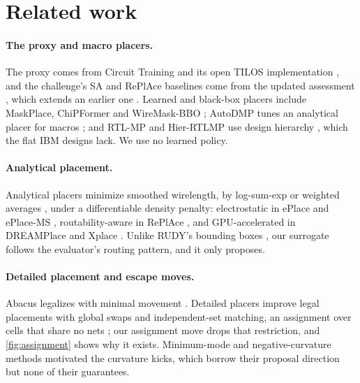 \section{Related work}\label{sec:related}

\paragraph{The proxy and macro placers.} The proxy comes from Circuit Training
\citep{mirhoseini2021graph} and its open TILOS implementation \citep{macroplacement},
and the challenge's SA and RePlAce baselines \citep{challenge2026} come from the
updated assessment \citep{cheng2025updated}, which extends an earlier one
\citep{cheng2023assessment}. Learned and black-box placers
include MaskPlace, ChiPFormer and WireMask-BBO
\citep{lai2022maskplace,lai2023chipformer,shi2023wiremask}; AutoDMP tunes an
analytical placer for macros \citep{agnesina2023autodmp}; and RTL-MP and Hier-RTLMP
use design hierarchy \citep{vidal2022rtlmp,kahng2023hierrtlmp}, which the flat IBM
designs \citep{adya2004unification} lack. We use no learned policy.

\paragraph{Analytical placement.} Analytical placers minimize smoothed wirelength,
by log-sum-exp \citep{naylor2001lse} or weighted averages \citep{hsu2011tsv}, under a
differentiable density penalty: electrostatic in ePlace and ePlace-MS
\citep{lu2015eplace,lu2016eplacems}, routability-aware in RePlAce
\citep{cheng2019replace}, and GPU-accelerated in DREAMPlace and Xplace
\citep{lin2019dreamplace,liu2022xplace}. Unlike RUDY's bounding boxes
\citep{spindler2007rudy}, our surrogate follows the evaluator's routing pattern, and
it only proposes.

\paragraph{Detailed placement and escape moves.} Abacus legalizes with minimal
movement \citep{spindler2008abacus}. Detailed placers improve legal placements with
global swaps \citep{pan2005ism} and independent-set matching, an assignment over
cells that share no nets \citep{chen2008ntuplace3}; our assignment move drops that
restriction, and \cref{fig:assignment} shows why it exists. Minimum-mode and
negative-curvature methods
\citep{henkelman1999dimer,e2011gad,carmon2018accelerated,liu2017negative} motivated
the curvature kicks, which borrow their proposal direction but none of their
guarantees.
